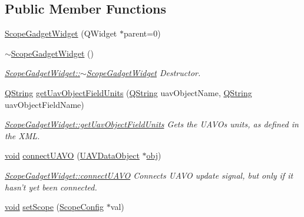 \subsection*{Public Member Functions}
\begin{DoxyCompactItemize}
\item 
\hyperlink{group__scopeplugin_ga2810fbb794c4531b885259a5100bcf79}{Scope\-Gadget\-Widget} (Q\-Widget $\ast$parent=0)
\item 
\hyperlink{group__scopeplugin_gaa4f8465d4475c6035056db0bb194b9fa}{$\sim$\-Scope\-Gadget\-Widget} ()
\begin{DoxyCompactList}\small\item\em \hyperlink{group__scopeplugin_gaa4f8465d4475c6035056db0bb194b9fa}{Scope\-Gadget\-Widget\-::$\sim$\-Scope\-Gadget\-Widget} Destructor. \end{DoxyCompactList}\item 
\hyperlink{group___u_a_v_objects_plugin_gab9d252f49c333c94a72f97ce3105a32d}{Q\-String} \hyperlink{group__scopeplugin_ga4fc130c09e788ead2fe9da284efb780b}{get\-Uav\-Object\-Field\-Units} (\hyperlink{group___u_a_v_objects_plugin_gab9d252f49c333c94a72f97ce3105a32d}{Q\-String} uav\-Object\-Name, \hyperlink{group___u_a_v_objects_plugin_gab9d252f49c333c94a72f97ce3105a32d}{Q\-String} uav\-Object\-Field\-Name)
\begin{DoxyCompactList}\small\item\em \hyperlink{group__scopeplugin_ga4fc130c09e788ead2fe9da284efb780b}{Scope\-Gadget\-Widget\-::get\-Uav\-Object\-Field\-Units} Gets the U\-A\-V\-Os units, as defined in the X\-M\-L. \end{DoxyCompactList}\item 
\hyperlink{group___u_a_v_objects_plugin_ga444cf2ff3f0ecbe028adce838d373f5c}{void} \hyperlink{group__scopeplugin_gae48ddd25c6bea599893a60ab02c375bf}{connect\-U\-A\-V\-O} (\hyperlink{class_u_a_v_data_object}{U\-A\-V\-Data\-Object} $\ast$\hyperlink{glext_8h_a0c0d4701a6c89f4f7f0640715d27ab26}{obj})
\begin{DoxyCompactList}\small\item\em \hyperlink{group__scopeplugin_gae48ddd25c6bea599893a60ab02c375bf}{Scope\-Gadget\-Widget\-::connect\-U\-A\-V\-O} Connects U\-A\-V\-O update signal, but only if it hasn't yet been connected. \end{DoxyCompactList}\item 
\hyperlink{group___u_a_v_objects_plugin_ga444cf2ff3f0ecbe028adce838d373f5c}{void} \hyperlink{group__scopeplugin_gaf7086ffcc7a7a1bbcaac30108908ea19}{set\-Scope} (\hyperlink{class_scope_config}{Scope\-Config} $\ast$val)

\end{DoxyCompactItemize}
